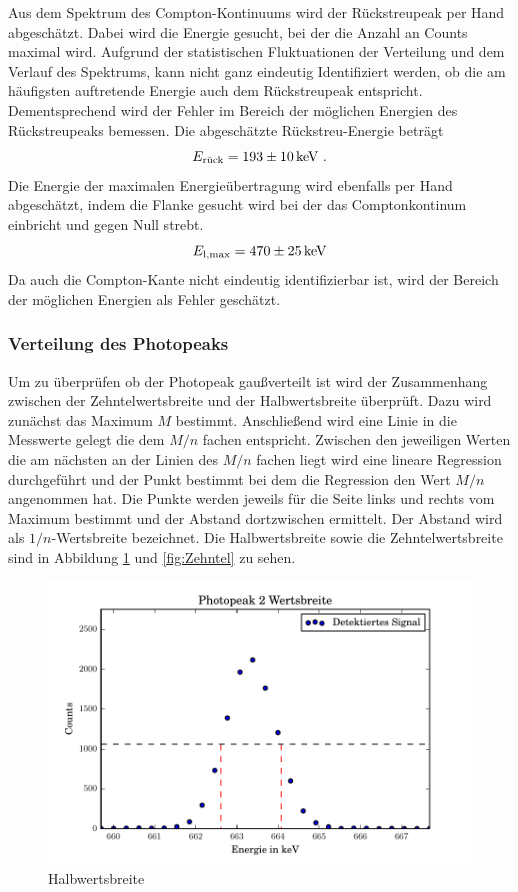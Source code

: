 Aus dem Spektrum des Compton-Kontinuums wird der Rückstreupeak per Hand abgeschätzt. Dabei wird die Energie gesucht, bei der die Anzahl an Counts maximal wird. Aufgrund der statistischen Fluktuationen der Verteilung und dem Verlauf des Spektrums, kann nicht ganz eindeutig Identifiziert werden, ob die am häufigsten auftretende Energie auch dem Rückstreupeak entspricht. Dementsprechend wird der Fehler im Bereich der möglichen Energien des Rückstreupeaks bemessen. Die abgeschätzte Rückstreu-Energie beträgt
\begin{equation}
  E_\text{rück} = \num{193 +- 10} \, \text{keV} \ .
  \label{eqn:KanExp}
\end{equation}
Die Energie der maximalen Energieübertragung wird ebenfalls per Hand abgeschätzt, indem die Flanke gesucht wird bei der das Comptonkontinum einbricht und gegen Null strebt.
\begin{equation}
  E_\text{l,max} = \num{470 +- 25} \, \text{keV}
  \label{eqn:RückExp}
\end{equation}
Da auch die Compton-Kante nicht eindeutig identifizierbar ist, wird der Bereich der möglichen Energien als Fehler geschätzt.


\subsubsection{Verteilung des Photopeaks}
Um zu überprüfen ob der Photopeak gaußverteilt ist wird der Zusammenhang zwischen der Zehntelwertsbreite und der Halbwertsbreite überprüft. Dazu wird zunächst das Maximum $M$ bestimmt. Anschließend wird eine Linie in die Messwerte gelegt die dem $M/n$ fachen entspricht. Zwischen den jeweiligen Werten die am nächsten an der Linien des $M/n$ fachen liegt wird eine lineare Regression durchgeführt und der Punkt bestimmt bei dem die Regression den Wert $M/n$ angenommen hat. Die Punkte werden jeweils für die Seite links und rechts vom Maximum bestimmt und der Abstand dortzwischen ermittelt. Der Abstand wird als $1/n$-Wertsbreite bezeichnet.
Die Halbwertsbreite sowie die Zehntelwertsbreite sind in Abbildung \ref{fig:Halb} und \ref{fig:Zehntel} zu sehen.

\begin{figure}[h]
  \centering
  \includegraphics[width=\textwidth]{./build/2Wertsbreite.pdf}
  \caption{Halbwertsbreite}
  \label{fig:Halb}
\end{figure}

